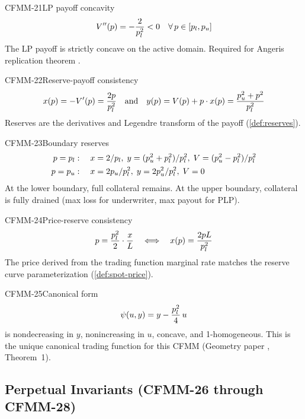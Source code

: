 \begin{invariant}{CFMM-21}{LP payoff concavity}
\[
  V''(p) = -\frac{2}{p_l^2} < 0 \quad\forall\, p \in [p_l, p_u]
\]
The LP payoff is strictly concave on the active domain.
Required for Angeris replication theorem \cite{angeris2021replicating}.
\end{invariant}

\begin{invariant}{CFMM-22}{Reserve-payoff consistency}
\[
  x(p) = -V'(p) = \frac{2p}{p_l^2}
  \quad\text{and}\quad
  y(p) = V(p) + p \cdot x(p) = \frac{p_u^2 + p^2}{p_l^2}
\]
Reserves are the derivatives and Legendre transform of the payoff
(\cref{def:reserves}).
\end{invariant}

\begin{invariant}{CFMM-23}{Boundary reserves}
\begin{align*}
  p = p_l &:\quad x = 2/p_l,\; y = (p_u^2 + p_l^2)/p_l^2,\; V = (p_u^2 - p_l^2)/p_l^2 \\
  p = p_u &:\quad x = 2p_u/p_l^2,\; y = 2p_u^2/p_l^2,\; V = 0
\end{align*}
At the lower boundary, full collateral remains. At the upper boundary, collateral
is fully drained (max loss for underwriter, max payout for PLP).
\end{invariant}

\begin{invariant}{CFMM-24}{Price-reserve consistency}
\[
  p = \frac{p_l^2}{2} \cdot \frac{x}{L}
  \quad\Longleftrightarrow\quad
  x(p) = \frac{2pL}{p_l^2}
\]
The price derived from the trading function marginal rate matches the
reserve curve parameterization (\cref{def:spot-price}).
\end{invariant}

\begin{invariant}{CFMM-25}{Canonical form}
\[
  \psi(u, y) = y - \frac{p_l^2}{4}\, u
\]
is nondecreasing in $y$, nonincreasing in $u$, concave, and 1-homogeneous.
This is the unique canonical trading function for this CFMM
(Geometry paper \cite{angeris2023geometry}, Theorem~1).
\end{invariant}

\subsection{Perpetual Invariants (CFMM-26 through CFMM-28)}\label{sec:perpetual-invariants}

